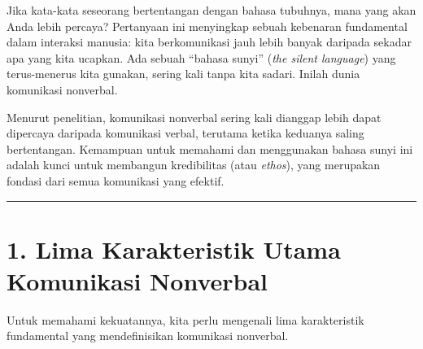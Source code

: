 \documentclass[
  letterpaper,
  DIV=11,
  numbers=noendperiod]{scrreprt}
\begin{document}
Jika kata-kata seseorang bertentangan dengan bahasa tubuhnya, mana yang
akan Anda lebih percaya? Pertanyaan ini menyingkap sebuah kebenaran
fundamental dalam interaksi manusia: kita berkomunikasi jauh lebih
banyak daripada sekadar apa yang kita ucapkan. Ada sebuah ``bahasa
sunyi'' (\emph{the silent language}) yang terus-menerus kita gunakan,
sering kali tanpa kita sadari. Inilah dunia komunikasi nonverbal.

Menurut penelitian, komunikasi nonverbal sering kali dianggap lebih
dapat dipercaya daripada komunikasi verbal, terutama ketika keduanya
saling bertentangan. Kemampuan untuk memahami dan menggunakan bahasa
sunyi ini adalah kunci untuk membangun kredibilitas (atau \emph{ethos}),
yang merupakan fondasi dari semua komunikasi yang efektif.

\begin{center}\rule{0.5\linewidth}{0.5pt}\end{center}

\section{1. Lima Karakteristik Utama Komunikasi
Nonverbal}\label{lima-karakteristik-utama-komunikasi-nonverbal}

Untuk memahami kekuatannya, kita perlu mengenali lima karakteristik
fundamental yang mendefinisikan komunikasi nonverbal.
\end{document}
